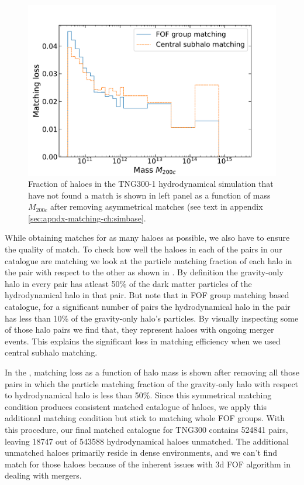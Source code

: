 \begin{figure}
    \includegraphics[width=\linewidth]{plots/hal_match_efficiency_mass_rev.pdf}
    \caption{Fraction of haloes in the TNG300-1 hydrodynamical simulation that have not found a match is shown in left panel as a function of mass $M_{200c}$ after removing asymmetrical matches (see text in appendix \ref{sec:apndx-matching-ch:simbase}.}
    \label{fig:efficiency-mass-rev-ch:simbase}
\end{figure}

While obtaining matches for as many haloes as possible, we also have to ensure the quality of match. To check how well the haloes in each of the pairs in our catalogue are matching we look at the particle matching fraction of each halo in the pair with respect to the other as shown in . By definition the gravity-only halo in every pair has atleast 50\% of the dark matter particles of the hydrodynamical halo in that pair. But note that in FOF group matching based catalogue, for a significant number of pairs the hydrodynamical halo in the pair has less than 10\% of the gravity-only halo's particles. By visually inspecting some of those halo pairs we find that, they represent haloes with ongoing merger events. This explains the significant loss in matching efficiency when we used central subhalo matching. 

In the , matching loss as a function of halo mass is shown after removing all those pairs in which the particle matching fraction of the gravity-only halo with respect to hydrodynamical halo is less than 50\%. Since this symmetrical matching condition produces consistent matched catalogue of haloes, we apply this additional matching condition  but stick to matching whole FOF groups. With this procedure, our final matched catalogue for TNG300 contains 524841 pairs, leaving 18747 out of 543588 hydrodynamical haloes unmatched. The additional unmatched haloes primarily reside in dense environments, and we can't find match for those haloes because of the inherent issues with 3d FOF algorithm in dealing with mergers. 


